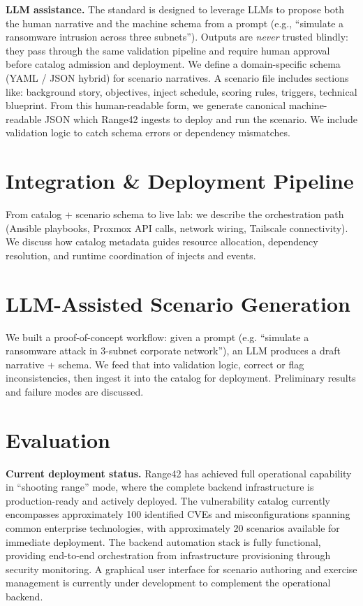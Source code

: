 \documentclass[11pt]{article}
\begin{document}
\textbf{LLM assistance.} The standard is designed to leverage LLMs to propose both the human narrative and the machine schema from a prompt (e.g., ``simulate a ransomware intrusion across three subnets'').
Outputs are \emph{never} trusted blindly: they pass through the same validation pipeline and require human approval before catalog admission and deployment.
We define a domain-specific schema (YAML / JSON hybrid) for scenario narratives. A scenario file includes sections like: background story, objectives, inject schedule, scoring rules, triggers, technical blueprint. From this human-readable form, we generate canonical machine-readable JSON which Range42 ingests to deploy and run the scenario. We include validation logic to catch schema errors or dependency mismatches.

\section{Integration \& Deployment Pipeline}
From catalog + scenario schema to live lab: we describe the orchestration path (Ansible playbooks, Proxmox API calls, network wiring, Tailscale connectivity). We discuss how catalog metadata guides resource allocation, dependency resolution, and runtime coordination of injects and events.

\section{LLM-Assisted Scenario Generation}
We built a proof-of-concept workflow: given a prompt (e.g. “simulate a ransomware attack in 3-subnet corporate network”), an LLM produces a draft narrative + schema. We feed that into validation logic, correct or flag inconsistencies, then ingest it into the catalog for deployment. Preliminary results and failure modes are discussed.

\section{Evaluation}


\textbf{Current deployment status.} 
Range42 has achieved full operational capability in ``shooting range'' mode, where the complete backend infrastructure is production-ready and actively deployed.
The vulnerability catalog currently encompasses approximately 100 identified CVEs and misconfigurations spanning common enterprise technologies, with approximately 20 scenarios available for immediate deployment.
The backend automation stack is fully functional, providing end-to-end orchestration from infrastructure provisioning through security monitoring.
A graphical user interface for scenario authoring and exercise management is currently under development to complement the operational backend.
\end{document}
